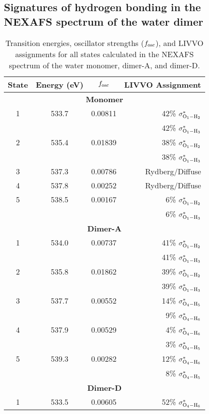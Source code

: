 \documentclass{article}
\begin{document}
\subsection{Signatures of hydrogen bonding in the NEXAFS spectrum of the water dimer}

\begin{table}[!t]
\renewcommand{\arraystretch}{1.2}
\centering
\footnotesize
\caption{Transition energies, oscillator strengths ($f_{\rm osc}$), and LIVVO assignments for all states calculated in the NEXAFS spectrum of the water monomer, dimer-A, and dimer-D.}
\begin{tabular}{@{\extracolsep{6pt}}cccr@{}}
\toprule
State & Energy (eV) & $f_{\rm osc}$ & LIVVO Assignment\\
\midrule
\multicolumn{4}{c}{\bf{Monomer}} \\
1 & 533.7 & 0.00811 & 42\% $\sigma^*_{\rm O_1-H_2}$ \\
 & & & 42\% $\sigma^*_{\rm O_1-H_3}$ \\
 2 & 535.4 & 0.01839 & 38\% $\sigma^*_{\rm O_1-H_2}$ \\
 & & & 38\% $\sigma^*_{\rm O_1-H_3}$ \\
 3 & 537.3 & 0.00786 & Rydberg/Diffuse \\
 4 & 537.8 & 0.00252 & Rydberg/Diffuse \\
 5 & 538.5 & 0.00167 & 6\% $\sigma^*_{\rm O_1-H_2}$ \\
 & & & 6\% $\sigma^*_{\rm O_1-H_3}$ \\
 \multicolumn{4}{c}{\bf{Dimer-A}} \\
 1 & 534.0 & 0.00737 & 41\% $\sigma^*_{\rm O_1-H_2}$ \\
 & & & 41\% $\sigma^*_{\rm O_1-H_3}$ \\
  2 & 535.8 & 0.01862 & 39\% $\sigma^*_{\rm O_1-H_2}$ \\
 & & & 39\% $\sigma^*_{\rm O_1-H_3}$ \\
   3 & 537.7 & 0.00552 & 14\% $\sigma^*_{\rm O_4-H_5}$ \\
 & & & 9\% $\sigma^*_{\rm O_4-H_6}$ \\
   4 & 537.9 & 0.00529 & 4\% $\sigma^*_{\rm O_4-H_6}$ \\
 & & & 3\% $\sigma^*_{\rm O_4-H_5}$ \\
   5 & 539.3 & 0.00282 & 12\% $\sigma^*_{\rm O_4-H_6}$ \\
 & & & 8\% $\sigma^*_{\rm O_4-H_5}$ \\
  \multicolumn{4}{c}{\bf{Dimer-D}} \\
 1 & 533.5 & 0.00605 & 52\% $\sigma^*_{\rm O_4-H_6}$ \\

\end{tabular}
\end{table}
\end{document}
